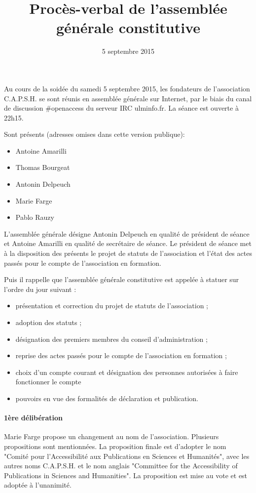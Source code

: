 \documentclass[a4paper]{article}
\title{Procès-verbal de l'assemblée générale constitutive}
\date{5 septembre 2015}
\begin{document}
\maketitle

Au cours de la soidée du samedi 5 septembre 2015, les fondateurs de l'association C.A.P.S.H. se sont réunis en assemblée générale sur Internet, par le biais du canal de discussion \#openaccess du serveur IRC ulminfo.fr. La séance est ouverte à 22h15.

Sont présents (adresses omises dans cette version publique):
\begin{itemize}
  \item Antoine Amarilli
  \item Thomas Bourgeat
  \item Antonin Delpeuch
  \item Marie Farge
  \item Pablo Rauzy
\end{itemize}
    
L'assemblée générale désigne Antonin Delpeuch en qualité de président de séance et Antoine Amarilli en qualité de secrétaire de séance.
Le président de séance met à la disposition des présents le projet de statuts de l'association et l'état des actes passés pour le compte de l'association en formation.

Puis il rappelle que l'assemblée générale constitutive est appelée à statuer sur l'ordre du jour suivant :
\begin{itemize}
  \item présentation et correction du projet de statuts de l'association ;
  \item adoption des statuts ;
  \item désignation des premiers membres du conseil d'administration ;
  \item reprise des actes passés pour le compte de l'association en formation ;
  \item choix d'un compte courant et désignation des personnes autorisées à faire fonctionner le compte
  \item pouvoirs en vue des formalités de déclaration et publication.
\end{itemize}
    
\paragraph{1ère délibération} Marie Farge propose un changement au nom de l'association. Plusieurs propositions sont mentionnées. La proposition finale est d'adopter le nom "Comité pour l'Accessibilité aux Publications en Sciences et Humanités", avec les autres noms C.A.P.S.H. et le nom anglais "Committee for the Accessibility of Publications in Sciences and Humanities". La proposition est mise au vote et est adoptée à l'unanimité.
\end{document}
